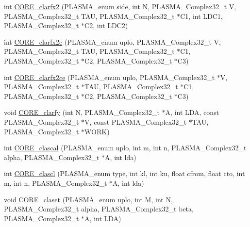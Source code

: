 \begin{DoxyCompactItemize}
\item 
int \hyperlink{group__CORE__PLASMA__Complex32__t_ga6ab3da186625191c12ddfd0e27aca922_ga6ab3da186625191c12ddfd0e27aca922}{C\+O\+R\+E\+\_\+clarfx2} (P\+L\+A\+S\+M\+A\+\_\+enum side, int N, P\+L\+A\+S\+M\+A\+\_\+\+Complex32\+\_\+t V, P\+L\+A\+S\+M\+A\+\_\+\+Complex32\+\_\+t T\+A\+U, P\+L\+A\+S\+M\+A\+\_\+\+Complex32\+\_\+t $\ast$C1, int L\+D\+C1, P\+L\+A\+S\+M\+A\+\_\+\+Complex32\+\_\+t $\ast$C2, int L\+D\+C2)
\item 
int \hyperlink{group__CORE__PLASMA__Complex32__t_gafd84d279fa45c7435bef96cca4128ebf_gafd84d279fa45c7435bef96cca4128ebf}{C\+O\+R\+E\+\_\+clarfx2c} (P\+L\+A\+S\+M\+A\+\_\+enum uplo, P\+L\+A\+S\+M\+A\+\_\+\+Complex32\+\_\+t V, P\+L\+A\+S\+M\+A\+\_\+\+Complex32\+\_\+t T\+A\+U, P\+L\+A\+S\+M\+A\+\_\+\+Complex32\+\_\+t $\ast$C1, P\+L\+A\+S\+M\+A\+\_\+\+Complex32\+\_\+t $\ast$C2, P\+L\+A\+S\+M\+A\+\_\+\+Complex32\+\_\+t $\ast$C3)
\item 
int \hyperlink{group__CORE__PLASMA__Complex32__t_ga27560b614aacabb021f8c902e4194ca5_ga27560b614aacabb021f8c902e4194ca5}{C\+O\+R\+E\+\_\+clarfx2ce} (P\+L\+A\+S\+M\+A\+\_\+enum uplo, P\+L\+A\+S\+M\+A\+\_\+\+Complex32\+\_\+t $\ast$V, P\+L\+A\+S\+M\+A\+\_\+\+Complex32\+\_\+t $\ast$T\+A\+U, P\+L\+A\+S\+M\+A\+\_\+\+Complex32\+\_\+t $\ast$C1, P\+L\+A\+S\+M\+A\+\_\+\+Complex32\+\_\+t $\ast$C2, P\+L\+A\+S\+M\+A\+\_\+\+Complex32\+\_\+t $\ast$C3)
\item 
void \hyperlink{group__CORE__PLASMA__Complex32__t_ga8eb544f55fe27c43c7c485ccafc46cd5_ga8eb544f55fe27c43c7c485ccafc46cd5}{C\+O\+R\+E\+\_\+clarfy} (int N, P\+L\+A\+S\+M\+A\+\_\+\+Complex32\+\_\+t $\ast$A, int L\+D\+A, const P\+L\+A\+S\+M\+A\+\_\+\+Complex32\+\_\+t $\ast$V, const P\+L\+A\+S\+M\+A\+\_\+\+Complex32\+\_\+t $\ast$T\+A\+U, P\+L\+A\+S\+M\+A\+\_\+\+Complex32\+\_\+t $\ast$W\+O\+R\+K)
\item 
int \hyperlink{group__CORE__PLASMA__Complex32__t_ga3087ef6316f2f1b9c096fbf5d8c5b545_ga3087ef6316f2f1b9c096fbf5d8c5b545}{C\+O\+R\+E\+\_\+clascal} (P\+L\+A\+S\+M\+A\+\_\+enum uplo, int m, int n, P\+L\+A\+S\+M\+A\+\_\+\+Complex32\+\_\+t alpha, P\+L\+A\+S\+M\+A\+\_\+\+Complex32\+\_\+t $\ast$A, int lda)
\item 
int \hyperlink{group__CORE__PLASMA__Complex32__t_ga1a4f4c74119e6dc9f291f8d7719e5295_ga1a4f4c74119e6dc9f291f8d7719e5295}{C\+O\+R\+E\+\_\+clascl} (P\+L\+A\+S\+M\+A\+\_\+enum type, int kl, int ku, float cfrom, float cto, int m, int n, P\+L\+A\+S\+M\+A\+\_\+\+Complex32\+\_\+t $\ast$A, int lda)
\item 
void \hyperlink{group__CORE__PLASMA__Complex32__t_ga2e708440b68df39ec3772768cd78d79e_ga2e708440b68df39ec3772768cd78d79e}{C\+O\+R\+E\+\_\+claset} (P\+L\+A\+S\+M\+A\+\_\+enum uplo, int M, int N, P\+L\+A\+S\+M\+A\+\_\+\+Complex32\+\_\+t alpha, P\+L\+A\+S\+M\+A\+\_\+\+Complex32\+\_\+t beta, P\+L\+A\+S\+M\+A\+\_\+\+Complex32\+\_\+t $\ast$A, int L\+D\+A)

\end{DoxyCompactItemize}
